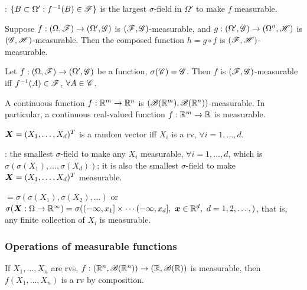 \documentclass[10pt,a4paper]{article}
\begin{document}
\noindent {}: $\{B\subset\Omega':f^{-1}(B)\in\mathscr{F}\}$ is the largest $\sigma$-field in $\Omega'$ to make $f$ measurable.    


\begin{thmbox}
	\begin{theorem}\label{thm:comp-mea}\rm
		Suppose $f:(\Omega,\mathscr{F})\to(\Omega',\mathscr{G})$ is $(\mathscr{F},\mathscr{G})$-measurable, and $g:(\Omega',\mathscr{G})\to(\Omega'',\mathscr{H})$ is $(\mathscr{G},\mathscr{H})$-measurable. Then the composed function $h=g\circ f$ is $(\mathscr{F},\mathscr{H})$-measurable.   
	\end{theorem}
	\begin{theorem}\label{thm:check-mea}\rm
		Let $f:(\Omega,\mathscr{F})\to(\Omega',\mathscr{G})$ be a function, $\sigma(\mathscr{C})=\mathscr{G}$. Then $f$ is $(\mathscr{F},\mathscr{G})$-measurable iff $f^{-1}(A)\in\mathscr{F}$, $\forall A\in\mathscr{C}$. 
	\end{theorem}
	\begin{theorem}\label{thm:cts-bbR}\rm
		A continuous function $f:\mathbb R^m\to\mathbb R^n$ is $(\mathscr{B}(\mathbb R^m),\mathscr{B}(\mathbb R^n))$-measurable. In particular, a continuous real-valued function $f:\mathbb R^m\to\mathbb R$ is measurable. 
	\end{theorem}
	\begin{theorem}\label{thm:rvec}\rm
		${\boldsymbol X}=(X_1 , \ldots , X_d)^T$ is a random vector iff $X_i$ is a rv, $\forall i=1,\ldots,d$.   
	\end{theorem}
\end{thmbox}
\noindent {}: the smallest $\sigma$-field to make any $X_i$ measurable, $\forall i=1,\ldots,d$, which is $\sigma(\sigma(X_1),\ldots,\sigma(X_d))$; it is also the smallest $\sigma$-field to make ${\boldsymbol X}=(X_1 , \ldots , X_d)^T$ measurable.

\noindent {}$=\sigma(\sigma(X_1),\sigma(X_2),\ldots)$ or $\sigma(\X:\Omega\to\bbR^\infty )=\sigma((-\infty ,x_1]\times\cdots(-\infty ,x_d],\ \x\in\bbR^d,\ d=1,2,\ldots,)$, that is, any finite collection of $X_i$ is measurable. 

\subsubsection{Operations of measurable functions}\label{sec:oper-mea}
If $X_1,\ldots,X_n$ are rvs, $f:(\mathbb R^n,\mathscr{B}(\mathbb R^n))\to(\mathbb R,\mathscr{B}(\mathbb R))$ is measurable, then $f(X_1,\ldots,X_n)$ is a rv by composition. 
\end{document}
